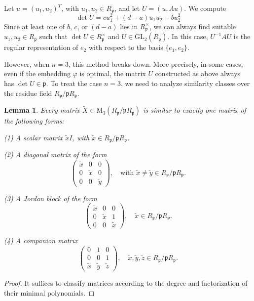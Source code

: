 \documentclass[12pt]{article}
\theoremstyle{plain}
\newtheorem{lemma}[theorem]{Lemma}
\theoremstyle{definition}
\theoremstyle{remark}
\begin{document}
Let $u=(u_1,u_2)^T$, with $u_1,u_2\in R_\mathfrak{p}$, and let $U=(u,Au)$. We compute
$$\det U=cu_1^2+(d-a)u_1u_2-bu_2^2$$
Since at least one of $b$, $c$, or $(d-a)$ lies in $R_\mathfrak{p}^\times$, we can always find suitable $u_1,u_2\in R_\mathfrak{p}$ such that $\det U\in R_\mathfrak{p}^\times$ and $U\in \mathrm{GL}_2(R_\mathfrak{p})$. In this case, $U^{-1}AU$ is the regular representation of $e_2$ with respect to the basis $\{e_1,e_2\}$.

However, when $n=3$, this method breaks down. More precisely, in some cases, even if the embedding $\varphi$ is optimal, the matrix $U$ constructed as above always has $\det U \in \mathfrak{p}$. To treat the case $n=3$, we need to analyze similarity classes over the residue field $R_\mathfrak{p}/\mathfrak{p}R_\mathfrak{p}$.

\begin{lemma}\label{similar}
Every matrix $\widetilde{X}\in \mathrm{M}_3(R_\mathfrak{p}/\mathfrak{p}R_\mathfrak{p})$ is similar to exactly one matrix of the following forms:

(1) A scalar matrix $\widetilde{x}I$, with $\widetilde{x}\in R_\mathfrak{p}/\mathfrak{p}R_\mathfrak{p}$.

(2) A diagonal matrix of the form 
$$\begin{pmatrix}
\widetilde{x} & 0 & 0 \\
0 & \widetilde{x} & 0 \\
0 & 0 & \widetilde{y}
\end{pmatrix},\quad \text{with } \widetilde{x}\ne \widetilde{y}\in R_\mathfrak{p}/\mathfrak{p}R_\mathfrak{p}.$$

(3) A Jordan block of the form 
$$\begin{pmatrix}
\widetilde{x} & 0 & 0 \\
0 & \widetilde{x} & 1 \\
0 & 0 & \widetilde{x}
\end{pmatrix},\quad \widetilde{x}\in R_\mathfrak{p}/\mathfrak{p}R_\mathfrak{p}.$$

(4) A companion matrix 
$$\begin{pmatrix}
0 & 1 & 0 \\
0 & 0 & 1 \\
\widetilde{x} & \widetilde{y} & \widetilde{z}
\end{pmatrix},\quad \widetilde{x},\widetilde{y},\widetilde{z}\in R_\mathfrak{p}/\mathfrak{p}R_\mathfrak{p}.$$
\end{lemma}

\begin{proof}
It suffices to classify matrices according to the degree and factorization of their minimal polynomials.
\end{proof}
\end{document}
